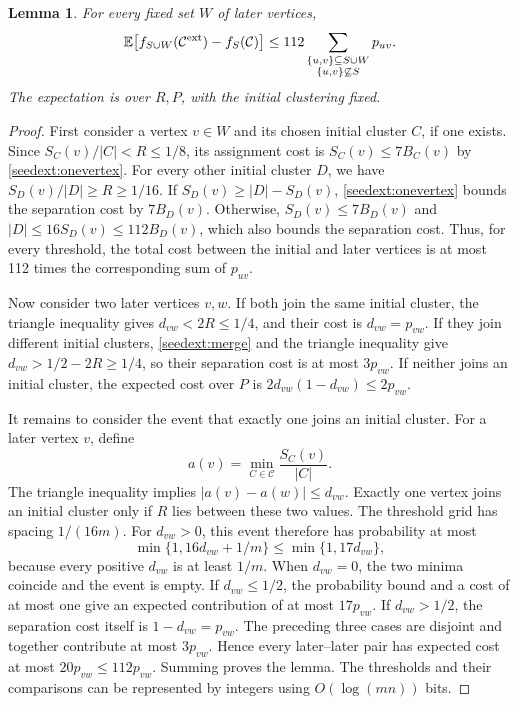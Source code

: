 \documentclass[11pt]{article}
\newtheorem{lemma}[theorem]{Lemma}
\begin{document}
\begin{lemma}
\label{seedext:additional}
For every fixed set $W$ of later vertices,
\[
 \mathbb E\bigl[f_{S\cup W}(\mathcal C^{\rm ext})-f_S(\mathcal C)\bigr]
 \le112\sum_{\substack{\{u,v\}\subseteq S\cup W\\
                        \{u,v\}\not\subseteq S}}p_{uv}.
\]
The expectation is over $R,P$, with the initial clustering fixed.
\end{lemma}
\begin{proof}
First consider a vertex $v\in W$ and its chosen initial cluster $C$,
if one exists. Since $S_C(v)/|C|<R\le1/8$, its assignment cost is
$S_C(v)\le7B_C(v)$ by \cref{seedext:onevertex}. For every other
initial cluster $D$, we have $S_D(v)/|D|\ge R\ge1/16$. If
$S_D(v)\ge|D|-S_D(v)$, \cref{seedext:onevertex} bounds the separation
cost by $7B_D(v)$. Otherwise, $S_D(v)\le7B_D(v)$ and
$|D|\le16S_D(v)\le112B_D(v)$, which also bounds the separation cost.
Thus, for every threshold, the total cost between the initial and
later vertices is at most 112 times the corresponding sum of $p_{uv}$.

Now consider two later vertices $v,w$. If both join the same initial
cluster, the triangle inequality gives $d_{vw}<2R\le1/4$, and their
cost is $d_{vw}=p_{vw}$. If they join different initial clusters,
\cref{seedext:merge} and the triangle inequality give
$d_{vw}>1/2-2R\ge1/4$, so their separation cost is at most $3p_{vw}$.
If neither joins an initial cluster, the expected cost over $P$ is
$2d_{vw}(1-d_{vw})\le2p_{vw}$.

It remains to consider the event that exactly one joins an initial
cluster. For a later vertex $v$, define
\[
 a(v)=\min_{C\in\mathcal C}\frac{S_C(v)}{|C|}.
\]
The triangle inequality implies $|a(v)-a(w)|\le d_{vw}$. Exactly one
vertex joins an initial cluster only if $R$ lies between these two
values. The threshold grid has spacing $1/(16m)$. For $d_{vw}>0$,
this event therefore has probability at most
\[
 \min\{1,16d_{vw}+1/m\}\le\min\{1,17d_{vw}\},
\]
because every positive $d_{vw}$ is at least $1/m$. When $d_{vw}=0$,
the two minima coincide and the event is empty. If $d_{vw}\le1/2$,
the probability bound and a cost of at most one give an expected
contribution of at most $17p_{vw}$. If $d_{vw}>1/2$, the separation
cost itself is $1-d_{vw}=p_{vw}$. The preceding three cases are
disjoint and together contribute at most $3p_{vw}$. Hence every
later--later pair has expected cost at most $20p_{vw}\le112p_{vw}$.
Summing proves the lemma. The thresholds and their comparisons can be
represented by integers using $O(\log(mn))$ bits.
\end{proof}
\end{document}
